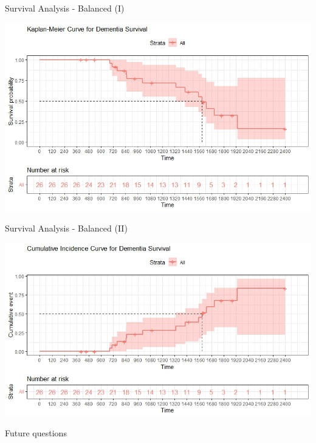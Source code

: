 \documentclass{beamer}
\begin{document}
	\begin{frame}{Survival Analysis - Balanced (I)}
	
		\begin{center}
			\includegraphics[width=\columnwidth]{kaplan-meier_bilanciati.jpeg}
		\end{center}
	\end{frame}
	
	\begin{frame}{Survival Analysis - Balanced (II)}
	
		\begin{center}
			\includegraphics[width=\columnwidth]{cumulative_bilanciati.jpeg}
		\end{center}
	\end{frame}

	
	\begin{frame}{Future questions}
		
	\end{frame}
	
	
\end{document}
